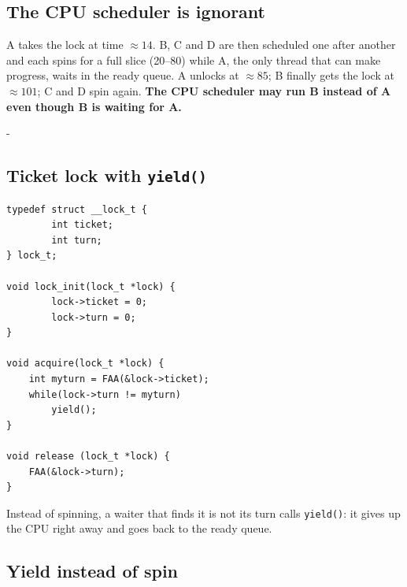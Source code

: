 \documentclass[11pt,a4paper]{article}
\makeatletter
\newcommand{\keepspace}[1]{\par\penalty-100\begingroup
  \setlength{\dimen@}{#1}\dimen@ii\pagegoal\advance\dimen@ii-\pagetotal
  \ifdim\dimen@>\dimen@ii\ifdim\dimen@ii>\z@\vfil\fi\break\fi\endgroup}
\newcommand{\blk}[5]{\draw[#4] (#1,0) rectangle (#2,1);
  \node[text=#5, font=\scriptsize\bfseries] at ({(#1+#2)/2},0.5) {#3};}
\newcommand{\ev}[2]{\node[font=\tiny, align=center, above] (e) at (#1,1.35) {#2};
  \draw[-{Latex[length=1.2mm]}] (#1,1.38) -- (#1,1.02);}
\newcommand{\spin}[2]{\node[font=\tiny, fill=black, text=white, inner sep=1.2pt] at ({(#1+#2)/2},1.22) {spin};}
\newcommand{\taxis}{\draw (0,-0.05) -- (160,-0.05);
  \foreach \t in {0,20,...,160} { \draw (\t,-0.05) -- (\t,-0.2); \node[below] at (\t,-0.15) {\t}; }}
\makeatother
\begin{document}
\subsection{The CPU scheduler is ignorant}

\begin{center}
\end{center}

A takes the lock at time \(\approx 14\). B, C and D are then scheduled one
after another and each spins for a full slice (20--80) while A, the only
thread that can make progress, waits in the ready queue. A unlocks at
\(\approx 85\); B finally gets the lock at \(\approx 101\); C and D spin
again. \textbf{The CPU scheduler may run B instead of A even though B is
waiting for A.}

\keepspace{24\baselineskip}
\subsection{Ticket lock with \texttt{yield()}}

\begin{lstlisting}
typedef struct __lock_t {
        int ticket;
        int turn;
} lock_t;

void lock_init(lock_t *lock) {
        lock->ticket = 0;
        lock->turn = 0;
}

void acquire(lock_t *lock) {
    int myturn = FAA(&lock->ticket);
    while(lock->turn != myturn)
        yield();
}

void release (lock_t *lock) {
    FAA(&lock->turn);
}
\end{lstlisting}

Instead of spinning, a waiter that finds it is not its turn calls
\texttt{yield()}: it gives up the CPU right away and goes back to the ready
queue.

\subsection{Yield instead of spin}
\end{document}
